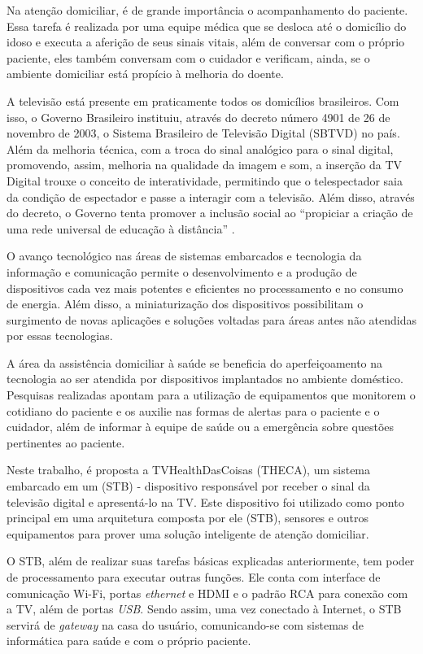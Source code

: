 Na atenção domiciliar, é de grande importância o acompanhamento do paciente.
Essa tarefa é realizada por uma equipe médica que se desloca até o domicílio do
idoso e executa a aferição de seus sinais vitais, além de conversar com o
próprio paciente, eles também conversam com o cuidador e verificam, ainda, se o
ambiente domiciliar está propício à melhoria do doente.

A televisão está presente em praticamente todos os  domicílios brasileiros. Com
isso, o Governo Brasileiro instituiu, através do decreto número 4901 de 26 de
novembro de 2003, o Sistema Brasileiro de Televisão Digital (SBTVD) no país.
Além da melhoria técnica, com a troca do sinal analógico para o sinal  digital,
promovendo, assim, melhoria na qualidade da imagem e som, a inserção  da TV
Digital trouxe o conceito de interatividade, permitindo que o  telespectador
saia da condição de espectador e passe a interagir com a  televisão. Além disso,
através do decreto, o Governo tenta promover a inclusão social ao ``propiciar a
criação de uma rede universal de educação à distância''
\cite{digitaltv2015decree}.

O avanço tecnológico nas áreas de sistemas embarcados e tecnologia da informação
e comunicação permite o desenvolvimento e a produção de dispositivos cada vez
mais potentes e eficientes no processamento e no consumo de energia. Além disso,
a miniaturização dos dispositivos possibilitam o surgimento de novas aplicações
e soluções voltadas para áreas antes não atendidas por essas tecnologias.

A área da assistência domiciliar à saúde se beneficia do aperfeiçoamento na 
tecnologia ao ser atendida por dispositivos implantados no ambiente doméstico. 
Pesquisas realizadas apontam para a utilização de equipamentos que monitorem o 
cotidiano do paciente e os auxilie nas formas de alertas para o paciente e o
cuidador, além de informar à equipe de saúde ou a emergência sobre questões 
pertinentes ao paciente.

Neste trabalho, é proposta a TVHealthDasCoisas (THECA), um sistema embarcado em
um \stb[] (STB) - dispositivo responsável por receber o sinal da  televisão
digital e apresentá-lo na TV. Este dispositivo foi utilizado como ponto principal em uma
arquitetura composta por ele (STB), sensores e outros equipamentos para  prover
uma solução inteligente de atenção domiciliar.

O STB, além de realizar suas tarefas básicas explicadas anteriormente, tem poder
de processamento para executar outras funções. Ele conta com interface de
comunicação Wi-Fi, portas \textit{ethernet} e HDMI e o padrão RCA para
conexão com a TV, além de portas \textit{USB}. Sendo assim, uma vez conectado à
Internet, o STB servirá de \textit{gateway} na casa do usuário, comunicando-se
com sistemas de informática para saúde e com o próprio paciente.

